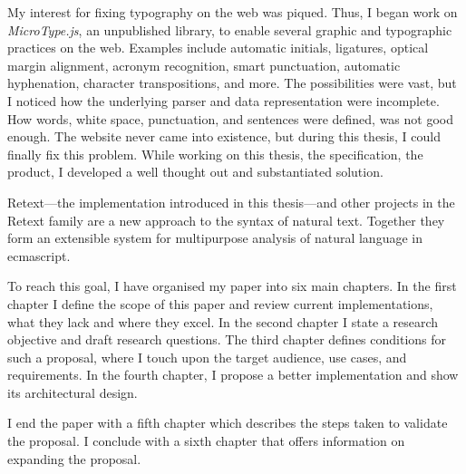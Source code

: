 My interest for fixing typography on the web was piqued.
Thus, I began work on \emph{MicroType.js}, an unpublished library, to
  enable several graphic and typographic practices on the web.
Examples include automatic initials, ligatures, optical margin alignment,
  acronym recognition, smart punctuation, automatic hyphenation, character
  transpositions, and more.
The possibilities were vast, but I noticed how the underlying parser and data
  representation were incomplete.
How words, white space, punctuation, and sentences were defined, was not
  good enough.
The website never came into existence, but during this thesis, I could
  finally fix this problem.
While working on this thesis, the specification, the product, I developed a
  well thought out and substantiated solution.

Retext---the implementation introduced in this thesis---and other projects
  in the Retext family are a new approach to the syntax of natural text.
Together they form an extensible system for multipurpose analysis of natural
  language in \gls{ecmascript}.

To reach this goal, I have organised my paper into six main chapters.
In the first chapter I define the scope of this paper and review current
  implementations, what they lack and where they excel.
In the second chapter I state a research objective and draft research
  questions.
The third chapter defines conditions for such a proposal, where I touch
  upon the target audience, use cases, and requirements.
In the fourth chapter, I propose a better implementation and show its
  architectural design.

I end the paper with a fifth chapter which describes the steps taken to
  validate the proposal.
I conclude with a sixth chapter that offers information on expanding the
  proposal.

\endgroup
